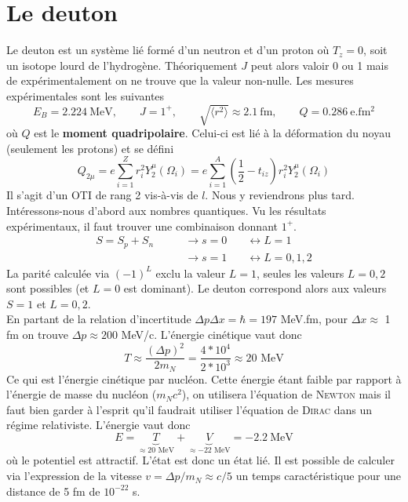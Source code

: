 	
\section{Le deuton}
Le deuton est un système lié formé d'un neutron et d'un proton où $T_z=0$, soit un isotope lourd de l'hydrogène.
Théoriquement  $J$ peut alors valoir 0 ou 1 mais de expérimentalement on ne trouve que la valeur non-nulle. 
Les mesures expérimentales sont les suivantes
\begin{equation}
E_B = 2.224\ \text{MeV},\qquad J=1^+,\qquad \sqrt{\langle r^2\rangle}\approx 2.1\ \text{fm}, \qquad Q=
0.286\ \text{e.fm$^{2}$}
\end{equation}
où $Q$ est le \textbf{moment quadripolaire}. Celui-ci est lié à la déformation du noyau (seulement les 
protons) et se défini
\begin{equation}
Q_{2\mu} = e\sum_{i=1}^Z r_i^2Y_2^\mu(\Omega_i) = e\sum_{i=1}^A \left(\frac{1}{2}-t_{iz}\right)r_i^2
Y_2^\mu(\Omega_i)
\end{equation}
Il s'agit d'un OTI de rang 2 vis-à-vis de $l$. Nous y reviendrons plus tard. Intéressons-nous d'abord 
aux nombres quantiques. Vu les résultats expérimentaux, il faut trouver une combinaison donnant $1^+$.
\begin{equation}
\begin{array}{lll}
S = S_p+S_n\qquad&\to s=0\quad &\leftrightarrow L=1\\
&\to s=1&\leftrightarrow L=0,1,2
\end{array}
\end{equation}
La parité calculée via $(-1)^L$ exclu la valeur $L=1$, seules les valeurs $L=0,2$ sont possibles (et $L=0$ 
est dominant). Le deuton correspond alors aux valeurs $S=1$ et $L=0,2$.\\

En partant de la relation d'incertitude $\Delta p\Delta x = \hbar = 197$ MeV.fm, pour $\Delta x\approx$ 
1 fm on trouve $\Delta p \approx 200$ MeV/c. L'énergie cinétique vaut donc 
\begin{equation}
T \approx \dfrac{(\Delta p)^2}{2m_N} = \dfrac{4*10^4}{2*10^3} \approx 20\text{ MeV}
\end{equation}
Ce qui est l'énergie cinétique par nucléon. Cette énergie étant faible par rapport à l'énergie de masse du 
nucléon ($m_Nc^2$), on utilisera l'équation de \textsc{Newton} mais il faut bien garder à l'esprit qu'il
faudrait utiliser l'équation de \textsc{Dirac} dans un régime relativiste. L'énergie vaut donc
\begin{equation}
E = \underbrace{T}_{\approx 20\text{ MeV}} + \underbrace{V}_{\approx -22\text{ MeV}} = -2.2\ \text{MeV}
\end{equation}
où le potentiel est attractif. L'état est donc un état lié. Il est possible de calculer via l'expression 
de la vitesse $v= \Delta p/m_N\approx c/5$ un temps caractéristique pour une distance de 5 fm de $10^{-22}$ s.
	
